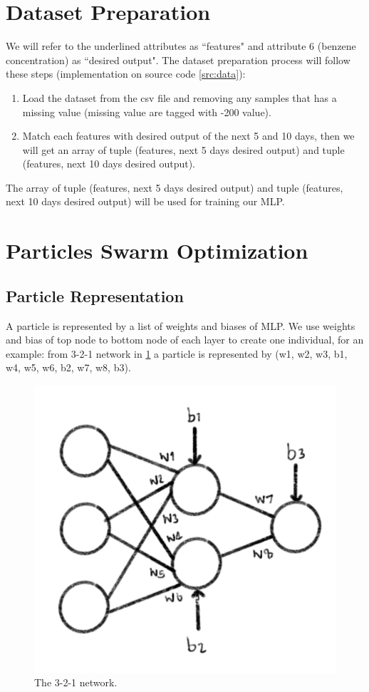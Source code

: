 \documentclass{article}
\begin{document}
\section*{Dataset Preparation}
We will refer to the underlined attributes as ``features" and attribute 6 (benzene concentration) as ``desired output". 
The dataset preparation process will follow these steps (implementation on source code \ref{src:data}): 
\begin{enumerate}
    \item {Load the dataset from the csv file and removing any samples that has a missing value 
    (missing value are tagged with -200 value).}
    \item {Match each features with desired output of the next 5 and 10 days, then we will get
    an array of tuple (features, next 5 days desired output) and tuple (features, next 10 days desired output).}
\end{enumerate}
The array of tuple (features, next 5 days desired output) and tuple (features, next 10 days desired output) will be used 
for training our MLP.

\section*{Particles Swarm Optimization}
\subsection*{Particle Representation}
A particle is represented by a list of weights and biases of MLP. 
We use weights and bias of top node to bottom node of each layer to create one individual, 
for an example: from 3-2-1 network in \cref*{fig:1} a particle is represented by (w1, w2, w3, b1, w4, w5, w6, b2, w7, w8, b3).

\begin{figure}[ht]
    \centering
    \includegraphics[scale = 0.25]{nn_example.jpg}
    \caption{The 3-2-1 network.}
    \label{fig:1}
\end{figure}
\end{document}
